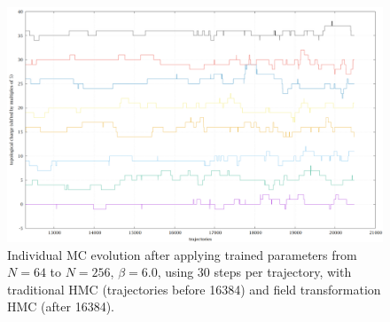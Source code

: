\begin{figure}
	\centering
	\includegraphics[width=\textwidth]{../topoevoN256_b6_n30.png}
	\caption{\label{topo-evo-n256-b6-s30}Individual MC evolution after
		applying trained parameters from $N=64$ to $N=256$, $β=6.0$,
		using 30 steps per trajectory,
		with traditional HMC (trajectories before 16384)
		and field transformation HMC (after 16384).}
\end{figure}

